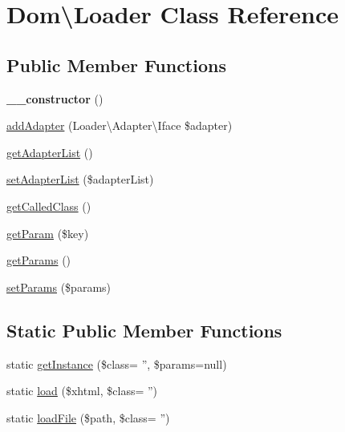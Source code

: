 \hypertarget{classDom_1_1Loader}{\section{Dom\textbackslash{}Loader Class Reference}
\label{classDom_1_1Loader}
}
\subsection*{Public Member Functions}
\begin{DoxyCompactItemize}
\item 
\hypertarget{classDom_1_1Loader_a22e9e9f8fe94dbbe3faca00256449aed}{{\bfseries \+\_\+\+\_\+constructor} ()}\label{classDom_1_1Loader_a22e9e9f8fe94dbbe3faca00256449aed}

\item 
\hyperlink{classDom_1_1Loader_a8e8f62caabd8232e3bcaeae5c562f96a}{add\+Adapter} (Loader\textbackslash{}\+Adapter\textbackslash{}\+Iface \$adapter)
\item 
\hyperlink{classDom_1_1Loader_ade110a37a00842718971f1ee949d88d8}{get\+Adapter\+List} ()
\item 
\hyperlink{classDom_1_1Loader_abb96d11ac038f83c8b567c3244793628}{set\+Adapter\+List} (\$adapter\+List)
\item 
\hyperlink{classDom_1_1Loader_acdc726286f38c8a1113b35fe96f2edaf}{get\+Called\+Class} ()
\item 
\hyperlink{classDom_1_1Loader_ae0f79c7246969eb8d49b6bdcac838838}{get\+Param} (\$key)
\item 
\hyperlink{classDom_1_1Loader_a00a5b8172e6fc5c94aa4e3309a77471e}{get\+Params} ()
\item 
\hyperlink{classDom_1_1Loader_a1eabca1b3a48a63a38fc86ad834f9704}{set\+Params} (\$params)
\end{DoxyCompactItemize}
\subsection*{Static Public Member Functions}
\begin{DoxyCompactItemize}
\item 
static \hyperlink{classDom_1_1Loader_a4c56e541a1b5efa748c70b88c4e978df}{get\+Instance} (\$class= '', \$params=null)
\item 
static \hyperlink{classDom_1_1Loader_aa44ab57ccc5fedca3423f7b4ff687369}{load} (\$xhtml, \$class= '')
\item 
static \hyperlink{classDom_1_1Loader_af7cbb027fb6f3c74cff99b8ea250bb67}{load\+File} (\$path, \$class= '')
\end{DoxyCompactItemize}
